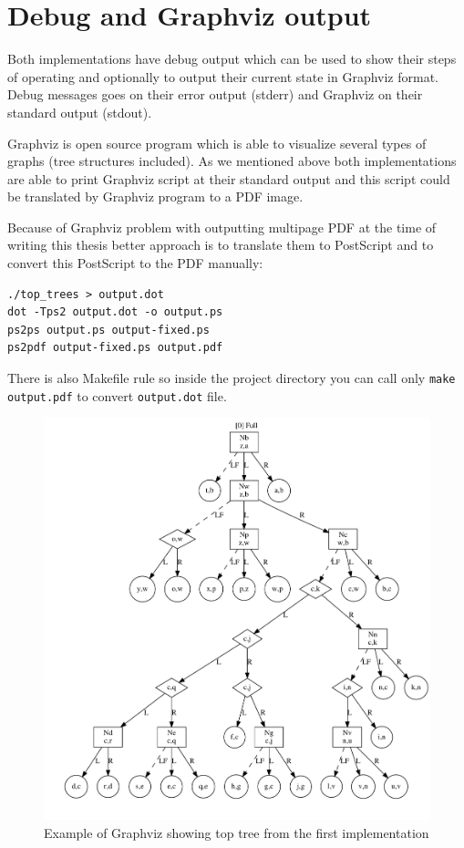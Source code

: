 \goodbreak

\section{Debug and Graphviz output}

Both implementations have debug output which can be used to show their
steps of operating and optionally to output their current state in Graphviz
format. Debug messages goes on their error output (stderr) and Graphviz on
their standard output (stdout).

Graphviz is open source program which is able to visualize several types of
graphs (tree structures included).  As we mentioned above both implementations
are able to print Graphviz script at their standard output and this script could
be translated by Graphviz program to a PDF image.

Because of Graphviz problem with outputting multipage PDF at the time of writing
this thesis better approach is to translate them to PostScript and to convert
this PostScript to the PDF manually:

\begin{verbatim}
./top_trees > output.dot
dot -Tps2 output.dot -o output.ps
ps2ps output.ps output-fixed.ps
ps2pdf output-fixed.ps output.pdf
\end{verbatim}

There is also Makefile rule so inside the project directory you can call only
\texttt{make output.pdf} to convert \texttt{output.dot} file.

\begin{figure}[h]
\centering
\includegraphics[width=0.8\hsize]{pic/chap04_graphviz_example.pdf}
\caption{Example of Graphviz showing top tree from the first implementation}
\end{figure}

